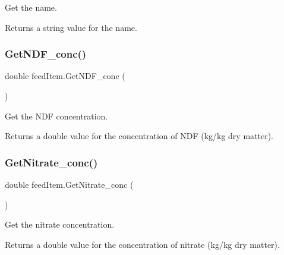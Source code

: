 Get the name. 

\begin{DoxyReturn}{Returns}
a string value for the name. 
\end{DoxyReturn}
\mbox{\label{classfeed_item_a389c3dfb020e459f46d0b0050898fa5d}} 
\subsubsection{\texorpdfstring{GetNDF\_conc()}{GetNDF\_conc()}}
{\footnotesize\ttfamily double feed\+Item.\+Get\+N\+D\+F\+\_\+conc (\begin{DoxyParamCaption}{ }\end{DoxyParamCaption})\hspace{0.3cm}{\ttfamily [inline]}}



Get the N\+DF concentration. 

\begin{DoxyReturn}{Returns}
a double value for the concentration of N\+DF (kg/kg dry matter). 
\end{DoxyReturn}
\mbox{\label{classfeed_item_a085b65e8acfd2244163a28feb7374491}} 
\subsubsection{\texorpdfstring{GetNitrate\_conc()}{GetNitrate\_conc()}}
{\footnotesize\ttfamily double feed\+Item.\+Get\+Nitrate\+\_\+conc (\begin{DoxyParamCaption}{ }\end{DoxyParamCaption})\hspace{0.3cm}{\ttfamily [inline]}}



Get the nitrate concentration. 

\begin{DoxyReturn}{Returns}
a double value for the concentration of nitrate (kg/kg dry matter). 
\end{DoxyReturn}
\mbox{\label{classfeed_item_aa72ab2d2d970e988b2f739e0abccf031}} 
